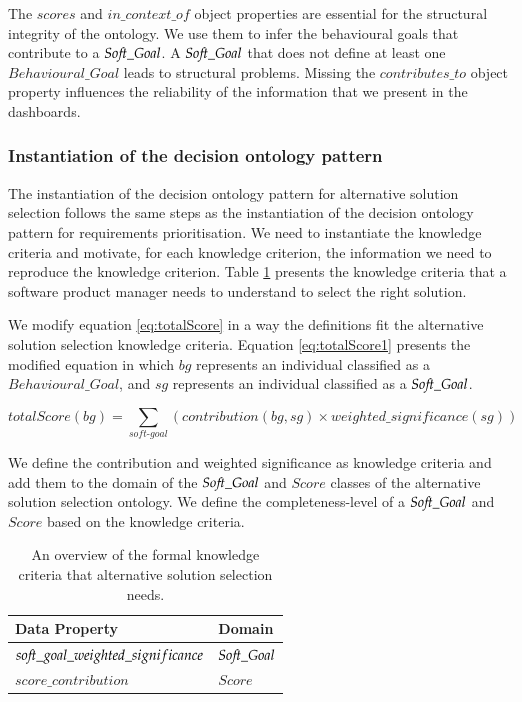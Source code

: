 The $scores$ and $in\_context\_of$ object properties are essential for the structural integrity of the ontology. We use them to infer the behavioural goals that contribute to a $So{\mkern-2mu f\mkern-3mu}t\_Goal$. A $So{\mkern-2mu f\mkern-3mu}t\_Goal$ that does not define at least one $Behavioural\_Goal$ leads to structural problems. Missing the $contributes\_to$ object property influences the reliability of the information that we present in the dashboards.

\subsubsection{Instantiation of the decision ontology pattern}
The instantiation of the decision ontology pattern for alternative solution selection follows the same steps as the instantiation of the decision ontology pattern for requirements prioritisation. We need to instantiate the knowledge criteria and motivate, for each knowledge criterion, the information we need to reproduce the knowledge criterion. Table \ref{table:as_formal_dataproperties} presents the knowledge criteria that a software product manager needs to understand to select the right solution.

We modify equation \ref{eq:totalScore} in a way the definitions fit the alternative solution selection knowledge criteria. Equation \ref{eq:totalScore1} presents the modified equation in which $bg$ represents an individual classified as a $Behavioural\_Goal$, and $sg$ represents an individual classified as a $So{\mkern-2mu f\mkern-3mu}t\_Goal$.

\begin{equation} \label{eq:totalScore1}
totalScore(bg)=\sum_{soft\text{-}goal} (contribution(bg,sg) \times weighted\_significance(sg))
\end{equation}

We define the contribution and weighted significance as knowledge criteria and add them to the domain of the $So{\mkern-2mu f\mkern-3mu}t\_Goal$ and $Score$ classes of the alternative solution selection ontology. We define the completeness-level of a $So{\mkern-2mu f\mkern-3mu}t\_Goal$ and $Score$ based on the knowledge criteria. 

\begin{table}[H]
\centering
\caption{An overview of the formal knowledge criteria that alternative solution selection needs.}
\begin{tabular}{| p{8cm} | p{4cm} | }
\hline
\rowcolor{document}
\color{documentText}Data Property & \color{documentText}Domain  \\
\hline
$so{\mkern-2mu f\mkern-3mu}t\_goal\_weighted\_significance$ & $So{\mkern-2mu f\mkern-3mu}t\_Goal$  \\
\hdashline
$score\_contribution$ & $Score$ \\
\hline
\end{tabular}
\label{table:as_formal_dataproperties}
\end{table}

